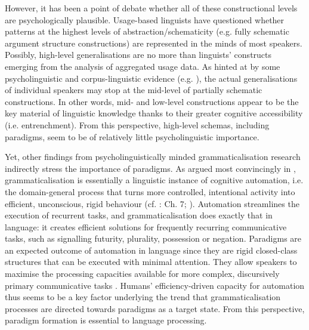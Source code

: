 \documentclass[output=paper]{langsci/langscibook}
\begin{document}
However, it has been a point of debate whether all of these constructional levels are psychologically plausible. Usage-based linguists have questioned whether patterns at the highest levels of abstraction/schematicity (e.g. fully schematic argument structure constructions) are represented in the minds of most speakers. Possibly, high-level generalisations are no more than linguists’ constructs emerging from the analysis of aggregated usage data. As hinted at by some psycholinguistic and corpus-linguistic evidence (e.g. \cites[]{Boas2003}[]{Dabrowska2008}[]{Dabrowska2015}[Ch. 5]{PerekArgumentstructureusagebased2015}[Ch. 5]{SchmidMantlik2015}), the actual generalisations of individual speakers may stop at the mid-level of partially schematic constructions. In other words, mid- and low-level constructions appear to be the key material of linguistic knowledge thanks to their greater cognitive accessibility (i.e. entrenchment). From this perspective, high-level schemas, including paradigms, seem to be of relatively little psycholinguistic importance. 

Yet, other findings from psycholinguistically minded grammaticalisation research indirectly stress the importance of paradigms. As argued most convincingly in \citet{LehmannGrammaticalizationautomation2017}, grammaticalisation is essentially a linguistic instance of cognitive automation, i.e. the domain-general process that turns more controlled, intentional activity into efficient, unconscious, rigid behaviour (cf. \citealt{Schneider1977, Loganinstancetheoryautomatization1988, Givon1989}: Ch. 7; \citealt{MoorsDeHouwer2006}). Automation streamlines the execution of recurrent tasks, and grammaticalisation does exactly that in language: it creates efficient solutions for frequently recurring communicative tasks, such as signalling futurity, plurality, possession or negation. Paradigms are an expected outcome of automation in language since they are rigid closed-class structures that can be executed with minimal attention. They allow speakers to maximise the processing capacities available for more complex, discursively primary communicative tasks \citep[cf.][]{HarderBoye2011}. Humans’ efficiency-driven capacity for automation thus seems to be a key factor underlying the trend that grammaticalisation processes are directed towards paradigms as a target state. From this perspective, paradigm formation is essential to language processing. 
\end{document}
